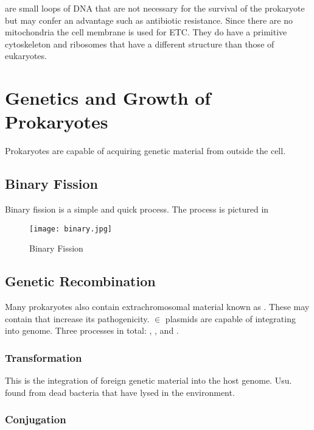 \documentclass[../Bio_chemistryReview.tex]{subfiles}
\begin{document}
 are small loops of DNA that are not necessary for the survival
of the prokaryote but may confer an advantage such as antibiotic resistance.
Since there are no mitochondria the cell membrane is used for ETC. They do have
a primitive cytoskeleton and ribosomes that have a different structure than
those of eukaryotes.

\section{Genetics and Growth of Prokaryotes\supdag}

Prokaryotes are capable of acquiring genetic material from outside the cell.

\subsection{Binary Fission\supdag}

Binary fission is a simple and quick process. The process is pictured in

\begin{figure}[H] \centering \texttt{[image: binary.jpg]}
  \caption{Binary Fission} \label{binfis} \end{figure}

\subsection{Genetic Recombination\supdag}

Many prokaryotes also contain extrachromosomal material known as
. These may contain  that increase its
pathogenicity.  $ \in $ plasmids are capable of integrating into
genome. Three processes in total: ,
, and .

\subsubsection{Transformation\supdag}

This is the integration of foreign genetic material into the host genome. Usu.
found from dead bacteria that have lysed in the environment.

\subsubsection{Conjugation\supdag}
\end{document}
